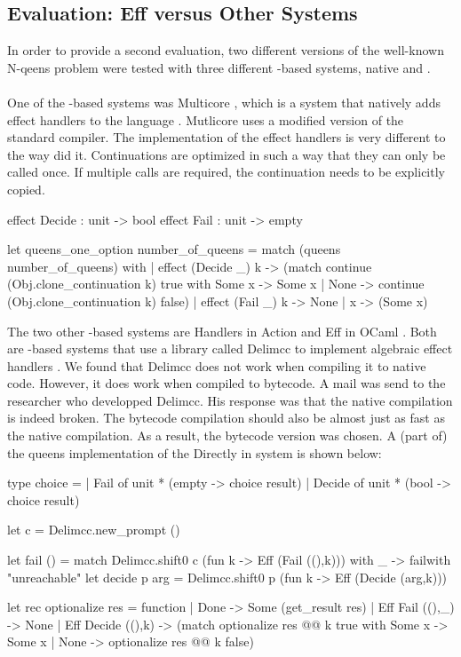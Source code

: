 \subsection{Evaluation: Eff versus Other Systems}
In order to provide a second evaluation, two different versions of the well-known N-qeens problem were tested with three different \ocaml-based systems, native \ocaml and \eff. \\
\\
One of the \ocaml-based systems was Multicore \ocaml, which is a system that natively adds effect handlers to the \ocaml language \cite{multicore}. Mutlicore \ocaml uses a modified version of the standard \ocaml compiler. The implementation of the effect handlers is very different to the way \eff did it. Continuations are optimized in such a way that they can only be called once. If multiple calls are required, the continuation needs to be explicitly copied. 

\begin{ocamllisting}
effect Decide : unit -> bool
effect Fail : unit -> empty

let queens_one_option number_of_queens =
  match (queens number_of_queens)
  with
  | effect (Decide _) k -> (match continue (Obj.clone_continuation k) true with Some x -> Some x | None -> continue (Obj.clone_continuation k) false)
  | effect (Fail _) k -> None
  | x -> (Some x)
\end{ocamllisting}

The two other \ocaml-based systems are Handlers in Action and Eff in OCaml \cite{handlersinaction} \cite{directly}. Both are \ocaml-based systems that use a library called Delimcc to implement algebraic effect handlers \cite{delimccweb}. We found that Delimcc does not work when compiling it to native code. However, it does work when compiled to bytecode. A mail was send to the researcher who developped Delimcc. His response was that the native compilation is indeed broken. The bytecode compilation should also be almost just as fast as the native compilation. As a result, the bytecode version was chosen. A (part of) the queens implementation of the \eff Directly in \ocaml system is shown below:

\begin{ocamllisting}
type choice =
  | Fail of unit * (empty -> choice result)
  | Decide of unit  * (bool -> choice result)

let c = Delimcc.new_prompt ()

let fail () = match Delimcc.shift0 c (fun k -> Eff (Fail ((),k))) with _ -> failwith "unreachable"
let decide p arg = Delimcc.shift0 p (fun k -> Eff (Decide (arg,k)))

let rec optionalize res = function
  | Done -> Some (get_result res)
  | Eff Fail ((),_) -> None
  | Eff Decide ((),k) -> (match optionalize res @@ k true with Some x -> Some x | None -> optionalize res @@ k false)
 \end{ocamllisting}

